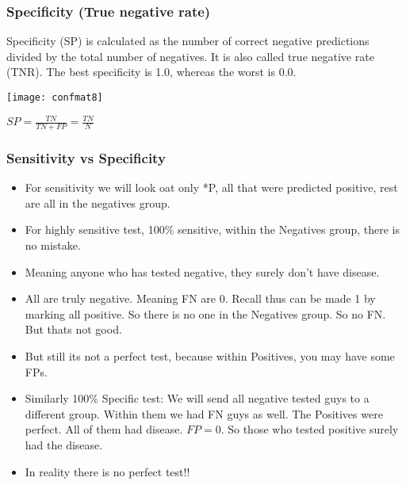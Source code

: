 \begin{frame}[fragile]\frametitle{Specificity (True negative rate)}

Specificity (SP) is calculated as the number of correct negative predictions divided by
the total number of negatives. It is also called true negative rate (TNR). The best
specificity is 1.0, whereas the worst is 0.0.

\begin{center}
\texttt{[image: confmat8]}
\end{center}

$SP = \frac{TN}{TN+FP} = \frac{TN}{N}$
\end{frame}


\begin{frame}[fragile]\frametitle{Sensitivity vs Specificity}

	\begin{itemize}
	\item For sensitivity we will look oat only *P, all that were predicted positive, rest are all in the negatives group.
	\item For highly sensitive test, 100\% sensitive, within the Negatives group, there is no mistake. 
	\item Meaning anyone who has tested negative, they surely don't have disease.
	\item All are truly negative. Meaning FN are 0. Recall thus can be made 1 by marking all positive. So there is no one in the Negatives group. So no FN. But thats not good.
	\item But still its not a perfect test, because within Positives, you may have some FPs.
	\item Similarly 100\% Specific test: We will send all negative tested guys to a different group. Within them we had FN guys as well. The Positives were perfect. All of them had disease. $FP=0$. So those who tested positive surely had the disease.
	\item In reality there is no perfect test!!
	\end{itemize}

\end{frame}


